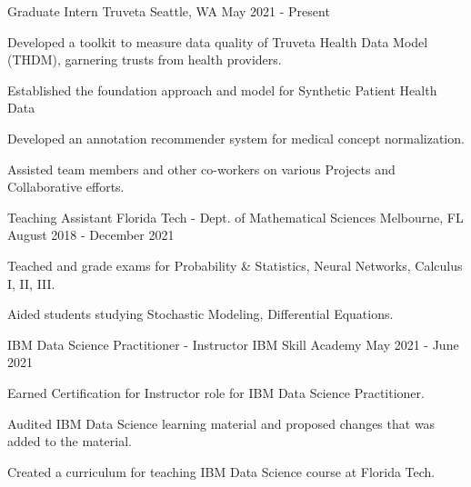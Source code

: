 \begin{cventries}

    \cventry
	{Graduate Intern}
	{Truveta}
	{Seattle, WA}
	{May 2021 - Present}
	{\begin{cvitems}
        \item {Developed a toolkit to measure data quality of Truveta Health Data Model (THDM), garnering trusts from health providers.}
        \item {Established the foundation approach and model for Synthetic Patient Health Data}
        \item {Developed an annotation recommender system for medical concept normalization.}
        \item {Assisted team members and other co-workers on various Projects and Collaborative efforts.}
		\end{cvitems}}
	\cventry
	{Teaching Assistant}
	{Florida Tech - Dept. of Mathematical Sciences}
	{Melbourne, FL}
	{August 2018 - December 2021}
	{\begin{cvitems}
		\item {Teached and grade exams for Probability \& Statistics, Neural Networks, Calculus I, II, III.}
		\item {Aided students studying Stochastic Modeling, Differential Equations.}
		\end{cvitems}}
    \cventry
	{IBM Data Science Practitioner - Instructor}
	{IBM Skill Academy}
	{}
	{May 2021 - June 2021}
	{\begin{cvitems}
        \item {Earned Certification for Instructor role for IBM Data Science Practitioner.}
        \item {Audited IBM Data Science learning material and proposed changes that was added to the material.}
        \item {Created a curriculum for teaching IBM Data Science course at Florida Tech.}
		\end{cvitems}}
\end{cventries}
\vspace{-4mm}